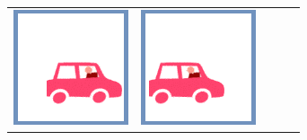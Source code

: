 \documentclass[12pt]{article}
\begin{document}
\begin{minipage}{\textwidth}
\begin{table}[H]
\begin{tabulary}{\linewidth}{|C|CCCC|}
				\vspace{0.01cm}\includegraphics[width=\linewidth]{option3} &
				\vspace{0.01cm}\includegraphics[width=\linewidth]{option2} &

\end{tabulary}
\end{table}
\end{minipage}
\end{document}
